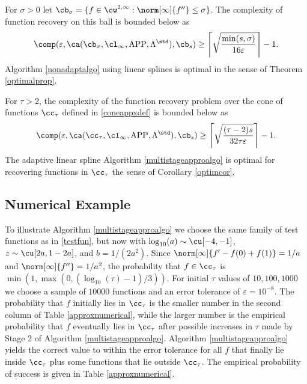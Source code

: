\begin{theorem} \label{complowbdappr} For $\sigma>0$ let $\cb_{\sigma}=\{f \in \cw^{2,\infty} : \norm[\infty]{f''} \le \sigma\}$.  The complexity of function recovery on this ball is bounded below as
\begin{equation*}
\comp(\varepsilon,\ca(\cb_{\sigma},\cl_\infty,\APP,\Lambda^{\std}),\cb_{s}) \ge \left \lceil \sqrt{\frac{\min(s,\sigma)}{16 \varepsilon}} \right \rceil -1 .
\end{equation*}
Algorithm \ref{nonadaptalgo} using linear splines is optimal in the sense of Theorem \ref{optimalprop}.

For $\tau>2$, the complexity of the function recovery problem over the cone of functions $\cc_{\tau}$ defined in \eqref{coneappxdef} is bounded below as
\begin{equation*}
\comp(\varepsilon,\ca(\cc_{\tau},\cl_\infty,\APP,\Lambda^{\std}),\cb_{s}) \ge \left \lceil \sqrt{\frac{(\tau-2)s}{32 \tau \varepsilon}} \right \rceil-1 .
\end{equation*}
The adaptive linear spline Algorithm \ref{multistageapproalgo} is optimal for recovering functions in $\cc_{\tau}$ the sense of Corollary \ref{optimcor}.
\end{theorem}

\subsection{Numerical Example}

To illustrate Algorithm \ref{multistageapproalgo} we choose the same  family of test functions as in \eqref{testfun}, but now with  $\log_{10}(a) \sim \cu[-4,-1]$, $z \sim \cu[2a,1-2a]$, and $b=1/(2a^2)$.   Since $\norm[\infty]{f'-f(0)+f(1)}=1/a$ and $\norm[\infty]{f''}=1/a^2$, the probability that $f \in \cc_{\tau}$ is $\min\left(1,\max(0,\left(\log_{10}(\tau)-1\right)/3)\right).$
For initial $\tau$ values of $10, 100 , 1000$ we choose a sample of  $10000$ functions and an error tolerance of  $\varepsilon = 10^{-8}$.  The probability that $f$ initially lies in $\cc_{\tau}$ is the smaller number in the second column of Table \ref{approxnumerical}, while the larger number is the empirical probability that $f$ eventually lies in $\cc_{\tau}$ after possible increases in $\tau$ made by Stage 2 of Algorithm \ref{multistageapproalgo}.  Algorithm \ref{multistageapproalgo} yields the correct value to within the error tolerance for all $f$ that finally lie inside $\cc_{\tau}$ plus some functions that lie outside $\cc_{\tau}$.  The empirical probability of success is given in Table \ref{approxnumerical}.


